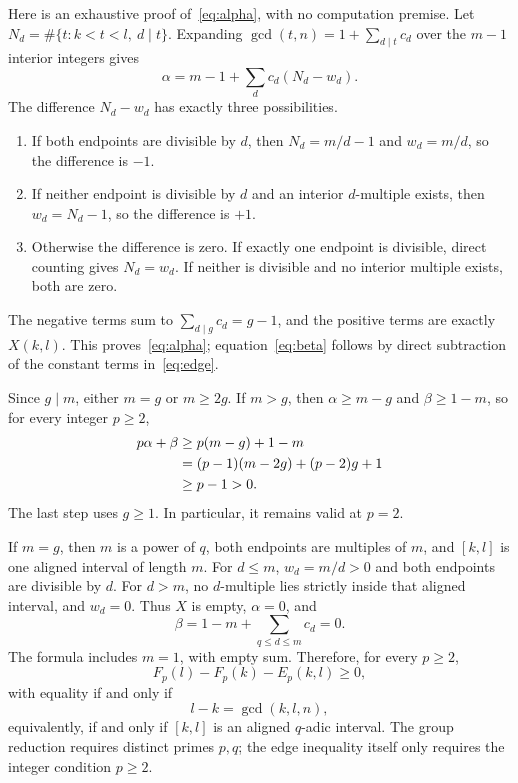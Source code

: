 \documentclass[11pt,letterpaper]{article}
\theoremstyle{definition}
\begin{document}
Here is an exhaustive proof of~\eqref{eq:alpha}, with no computation premise. Let
$N_d=\#\{t:k<t<l,\ d\mid t\}$. Expanding
$\gcd(t,n)=1+\sum_{d\mid t}c_d$ over the $m-1$ interior integers gives
\[
\alpha=m-1+\sum_d c_d(N_d-w_d).
\]
The difference $N_d-w_d$ has exactly three possibilities.
\begin{enumerate}
\item If both endpoints are divisible by $d$, then $N_d=m/d-1$ and $w_d=m/d$, so the difference is $-1$.
\item If neither endpoint is divisible by $d$ and an interior $d$-multiple exists, then $w_d=N_d-1$, so the difference is $+1$.
\item Otherwise the difference is zero. If exactly one endpoint is divisible, direct counting gives $N_d=w_d$. If neither is divisible and no interior multiple exists, both are zero.
\end{enumerate}
The negative terms sum to $\sum_{d\mid g}c_d=g-1$, and the positive terms are exactly $X(k,l)$. This proves~\eqref{eq:alpha}; equation~\eqref{eq:beta} follows by direct subtraction of the constant terms in~\eqref{eq:edge}.

Since $g\mid m$, either $m=g$ or $m\ge2g$. If $m>g$, then $\alpha\ge m-g$ and $\beta\ge1-m$, so for every integer $p\ge2$,
\begin{align}
p\alpha+\beta&\ge p(m-g)+1-m\notag\\
&=(p-1)(m-2g)+(p-2)g+1\notag\\
&\ge p-1>0.\label{eq:positive}
\end{align}
The last step uses $g\ge1$. In particular, it remains valid at $p=2$.

If $m=g$, then $m$ is a power of $q$, both endpoints are multiples of $m$, and $[k,l]$ is one aligned interval of length $m$. For $d\le m$, $w_d=m/d>0$ and both endpoints are divisible by $d$. For $d>m$, no $d$-multiple lies strictly inside that aligned interval, and $w_d=0$. Thus $X$ is empty, $\alpha=0$, and
\[
\beta=1-m+\sum_{q\le d\le m}c_d=0.
\]
The formula includes $m=1$, with empty sum. Therefore, for every $p\ge2$,
\begin{equation}
F_p(l)-F_p(k)-E_p(k,l)\ge0,\label{eq:nonneg}
\end{equation}
with equality if and only if
\begin{equation}
l-k=\gcd(k,l,n),\label{eq:aligned}
\end{equation}
equivalently, if and only if $[k,l]$ is an aligned $q$-adic interval. The group reduction requires distinct primes $p,q$; the edge inequality itself only requires the integer condition $p\ge2$.
\end{document}
